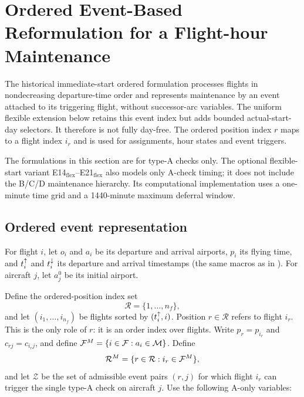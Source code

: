 \section{Ordered Event-Based Reformulation for a Flight-hour Maintenance}
\label{sec:event_reformulation}

The historical immediate-start ordered formulation processes flights in
nondecreasing departure-time order and represents maintenance by an event
attached to its triggering flight, without successor-arc variables. The
uniform flexible extension below retains this event index but adds bounded
actual-start-day selectors. It therefore is not fully day-free. The ordered
position index $r$ maps to a flight index $i_r$ and is used for assignments,
hour states and event triggers.

The formulations in this section are for type-A checks only. The optional
flexible-start variant E14$_{\mathrm{flex}}$--E21$_{\mathrm{flex}}$ also
models only A-check timing; it does not include the B/C/D maintenance
hierarchy. Its computational implementation uses a one-minute time grid and a
1440-minute maximum deferral window.

\subsection{Ordered event representation}

For flight $i$, let $o_i$ and $a_i$ be its departure and arrival airports,
$p_i$ its flying time, and $t^{\uparrow}_{i}$ and $t^{\downarrow}_{i}$ its departure and arrival
timestamps (the same macros as in ). For aircraft $j$, let $a^0_j$ be its initial airport.

Define the ordered-position index set
\[
\mathcal{R}=\{1,\ldots,n_f\},
\]
and let $(i_1,\ldots,i_{n_f})$ be flights sorted by $(t^{\uparrow}_{i},i)$. Position
$r\in\mathcal{R}$ refers to flight $i_r$. This is the only role of $r$: it is
an order index over flights. Write $p_r=p_{i_r}$ and $c_{rj}=c_{i_rj}$,
and define $\mathcal{F}^M=\{i\in\mathcal{F}:a_i\in\mathcal{M}\}$. Define
\[
\mathcal{R}^M=\{r\in\mathcal{R}: i_r\in\mathcal{F}^M\},
\]
and let $\mathcal{Z}$ be the set of admissible event pairs $(r,j)$ for which
flight $i_r$ can trigger the single type-A check on aircraft $j$.
Use the following A-only variables:
